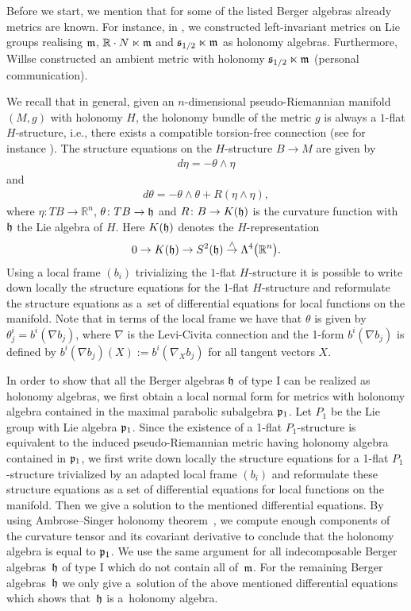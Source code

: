 \documentclass[11pt]{article}
\numberwithin{equation}{section}
\newcommand\fh{{\frak h}}
\newcommand\fm{{\frak m}}
\newcommand\fs{{\frak s}}
\newcommand\RR{{\mathbb R}}
\begin{document}
Before we start, we mention that for some of the listed Berger algebras already metrics are known. For instance, in \cite{FK}, we constructed left-invariant metrics on Lie groups realising $\fm$, $\RR\cdot N\ltimes \fm$ and $\fs_{1/2}\ltimes \fm$ as holonomy algebras. Furthermore, Willse constructed an ambient metric with holonomy $\fs_{1/2}\ltimes \fm$ (personal communication).

We recall that in general, given an $n$-dimensional pseudo-Riemannian manifold $(M, g)$ with holonomy $H$, the holonomy bundle of the metric $g$ is always a $1$-flat $H$-structure, i.e., there exists a compatible torsion-free connection (see for instance \cite{Bryant}). The structure equations on the $H$-structure $B \rightarrow M$ are given by
\begin{gather*}
d \eta = - \theta \wedge \eta
\end{gather*}
and
\begin{gather*}
d \theta = - \theta \wedge \theta +R (\eta \wedge \eta),
\end{gather*}
where $\eta\colon TB \rightarrow {\mathbb R}^n$, $\theta\colon TB \rightarrow \frak h$ and $R\colon B \rightarrow K (\frak h)$ is the curvature function with $\frak h$ the Lie algebra of $H$. Here $K (\frak h)$ denotes the $H$-representation
\begin{gather*}
0 \rightarrow K (\frak h) \rightarrow S^2 (\frak h) \overset{\wedge}{\rightarrow} \Lambda^4 \big(\mathbb R^n\big).
\end{gather*}
Using a local frame $(b_i)$ trivializing the $1$-flat $H$-structure it is possible to write down locally the structure equations for the 1-flat $H$-structure and reformulate the structure equations as a~set of differential equations for local functions on the manifold. Note that in terms of the local frame we have that $\theta$ is given by $\theta^i_j=b^i(\nabla{b_j})$, where $\nabla$ is the Levi-Civita connection and the 1-form $b^i(\nabla{b_j})$ is defined by $b^i(\nabla{b_j})(X):=b^i(\nabla_X{b_j})$ for all tangent vectors $X$.

In order to show that all the Berger algebras $\frak h$ of type I can be realized as holonomy algebras, we first obtain a local normal form for metrics with holonomy algebra contained in the maximal parabolic subalgebra $\frak p_1$. Let $P_1$ be the Lie group with Lie algebra $\frak p_1$. Since the existence of a 1-flat $P_1$-structure is equivalent to the induced pseudo-Riemannian metric having holonomy algebra contained in $\frak p_1$, we first write down locally the structure equations for a 1-flat $P_1$-structure trivialized by an adapted local frame $(b_i)$ and reformulate these structure equations as a set of differential equations for local functions on the manifold. Then we give a solution to the mentioned differential equations. By using Ambrose--Singer holonomy theorem~\cite{AS}, we compute enough components of the curvature tensor and its covariant derivative to conclude that the holonomy algebra is equal to $\frak p_1$. We use the same argument for all indecomposable Berger algebras~$\frak h$ of type I which do not contain all of~$\frak m$. For the remaining Berger algebras~$\frak h$ we only give a~solution of the above mentioned differential equations which shows that~$\fh$ is a~holonomy algebra.
\end{document}
